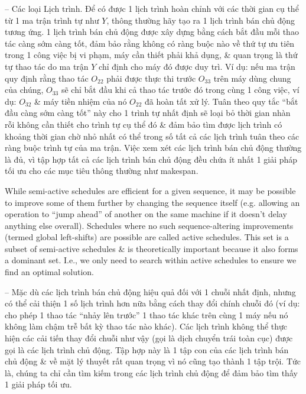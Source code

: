 \documentclass{article}
\begin{document}
\begin{itemize}
\begin{itemize}
\begin{itemize}
            -- {\sf Các loại Lịch trình.} Để có được 1 lịch trình hoàn chỉnh với các thời gian cụ thể từ 1 ma trận trình tự như $Y$, thông thường hãy tạo ra 1 lịch trình bán chủ động tương ứng. 1 lịch trình bán chủ động được xây dựng bằng cách bắt đầu mỗi thao tác càng sớm càng tốt, đảm bảo rằng không có ràng buộc nào về thứ tự ưu tiên trong 1 công việc bị vi phạm, máy cần thiết phải khả dụng, \& quan trọng là thứ tự thao tác do ma trận $Y$ chỉ định cho máy đó được duy trì. Ví dụ: nếu ma trận quy định rằng thao tác $O_{22}$ phải được thực thi trước $O_{33}$ trên máy dùng chung của chúng, $O_{33}$ sẽ chỉ bắt đầu khi cả thao tác trước đó trong cùng 1 công việc, ví dụ: $O_{32}$ \& máy tiền nhiệm của nó $O_{22}$ đã hoàn tất xử lý. Tuân theo quy tắc ``bắt đầu càng sớm càng tốt'' này cho 1 trình tự nhất định sẽ loại bỏ thời gian nhàn rỗi không cần thiết cho trình tự cụ thể đó \& đảm bảo tìm được lịch trình có khoảng thời gian chờ nhỏ nhất có thể trong số tất cả các lịch trình tuân theo các ràng buộc trình tự của ma trận. Việc xem xét các lịch trình bán chủ động thường là đủ, vì tập hợp tất cả các lịch trình bán chủ động đều chứa ít nhất 1 giải pháp tối ưu cho các mục tiêu thông thường như makespan.

            While semi-active schedules are efficient for a given sequence, it may be possible to improve some of them further by changing the sequence itself (e.g. allowing an operation to ``jump ahead'' of another on the same machine if it doesn't delay anything else overall). Schedules where no such sequence-altering improvements (termed global left-shifts) are possible are called active schedules. This set is a subset of semi-active schedules \& is theoretically important because it also forms a dominant set. I.e., we only need to search within active schedules to ensure we find an optimal solution.

            -- Mặc dù các lịch trình bán chủ động hiệu quả đối với 1 chuỗi nhất định, nhưng có thể cải thiện 1 số lịch trình hơn nữa bằng cách thay đổi chính chuỗi đó (ví dụ: cho phép 1 thao tác ``nhảy lên trước'' 1 thao tác khác trên cùng 1 máy nếu nó không làm chậm trễ bất kỳ thao tác nào khác). Các lịch trình không thể thực hiện các cải tiến thay đổi chuỗi như vậy (gọi là dịch chuyển trái toàn cục) được gọi là các lịch trình chủ động. Tập hợp này là 1 tập con của các lịch trình bán chủ động \& về mặt lý thuyết rất quan trọng vì nó cũng tạo thành 1 tập trội. Tức là, chúng ta chỉ cần tìm kiếm trong các lịch trình chủ động để đảm bảo tìm thấy 1 giải pháp tối ưu.


\end{itemize}
\end{itemize}
\end{itemize}
\end{document}
